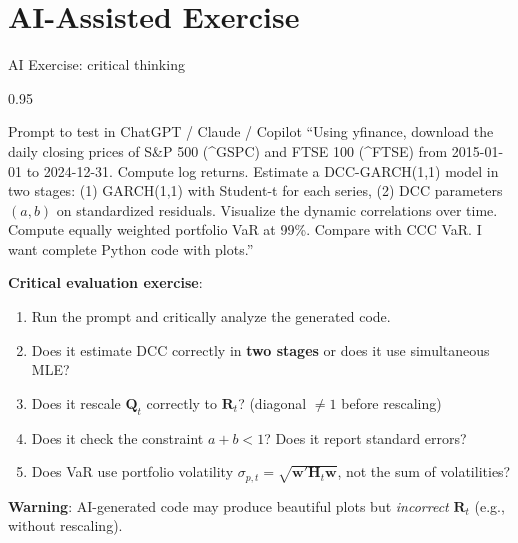 \documentclass[9pt, aspectratio=169, t]{beamer}
\begin{document}
\section{AI-Assisted Exercise}

\begin{frame}{AI Exercise: critical thinking}
    \begin{cminipage}{0.95\textwidth}
    \vspace{-3mm}
    \begin{block}{\footnotesize Prompt to test in ChatGPT / Claude / Copilot}
        {\footnotesize
        ``Using yfinance, download the daily closing prices of S\&P 500 (\^{}GSPC) and FTSE 100 (\^{}FTSE) from 2015-01-01 to 2024-12-31. Compute log returns. Estimate a DCC-GARCH(1,1) model in two stages: (1) GARCH(1,1) with Student-t for each series, (2) DCC parameters $(a, b)$ on standardized residuals. Visualize the dynamic correlations over time. Compute equally weighted portfolio VaR at 99\%. Compare with CCC VaR. I want complete Python code with plots.''
        }
    \end{block}
    \vspace{-2mm}
    {\footnotesize
    \textbf{Critical evaluation exercise}:
    \begin{enumerate}\setlength{\itemsep}{0pt}
        \item Run the prompt and critically analyze the generated code.
        \item Does it estimate DCC correctly in \textbf{two stages} or does it use simultaneous MLE?
        \item Does it rescale $\mathbf{Q}_t$ correctly to $\mathbf{R}_t$? (diagonal $\neq 1$ before rescaling)
        \item Does it check the constraint $a + b < 1$? Does it report standard errors?
        \item Does VaR use portfolio volatility $\sigma_{p,t} = \sqrt{\mathbf{w}'\mathbf{H}_t\mathbf{w}}$, not the sum of volatilities?
    \end{enumerate}
    }
    \vspace{-2mm}
    \begin{alertblock}{}
        {\footnotesize \textbf{Warning}: AI-generated code may produce beautiful plots but \textit{incorrect} $\mathbf{R}_t$ (e.g., without rescaling).}
    \end{alertblock}
    \end{cminipage}
\end{frame}
\end{document}
